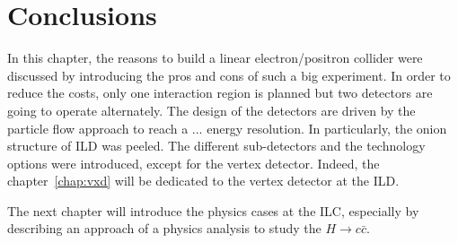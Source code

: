    \section{Conclusions}

   In this chapter, the reasons to build a linear electron/positron collider were discussed by introducing the pros and cons of such a big experiment.
   In order to reduce the costs, only one interaction region is planned but two detectors are going to operate alternately. 
   The design of the detectors are driven by the particle flow approach to reach a ... energy resolution.
   In particularly, the  onion structure of \gls{ILD} was peeled. 
   The different sub-detectors and the technology options were introduced, except for the vertex detector.
   Indeed, the chapter~\ref{chap:vxd} will be dedicated to the vertex detector at the \gls{ILD}.

   The next chapter will introduce the physics cases at the \gls{ILC}, especially by describing an approach of a physics analysis to study the $H \rightarrow c\bar{c}$.


